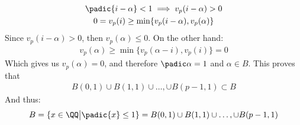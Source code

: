 \begin{enumerate}[label=\ilabel]
        \begin{gather*}
            \padic{i - \alpha} < 1 \implies v_p(i - \alpha) > 0  \\
            0 = v_p(i) \ge \min \{v_p(i - \alpha), v_p(\alpha) \}
        \end{gather*}
        Since $v_p(i - \alpha) > 0$, then $v_p(\alpha) \le 0$. On the other hand:
        \begin{gather*}
            v_p(\alpha) \ge \min \{v_p(\alpha - i) , v_p(i) \} = 0
        \end{gather*}
        Which gives us $v_p(\alpha) = 0$, and therefore $\padic \alpha = 1$ and $\alpha \in B$. This proves that 
        \begin{gather*}
            B(0, 1) \cup B(1, 1) \cup \dots, \cup B(p - 1, 1) \subset B
        \end{gather*}
        And thus:
        \begin{gather*}
            B = \{x \in \QQ \big| \padic{x} \le 1 \} = B(0, 1) \cup B(1, 1) \cup \dots, \cup B(p - 1, 1) 
        \end{gather*}
\end{enumerate}